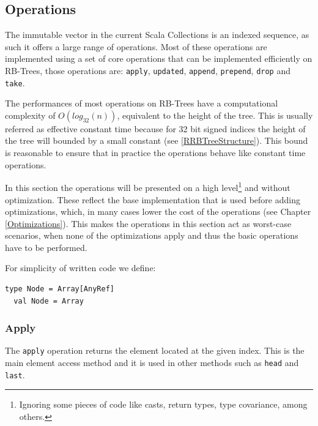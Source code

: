 \subsection{Operations}
\label{Operations}
The immutable vector in the current Scala Collections is an indexed sequence, as such it offers a large range of operations. Most of these operations are implemented using a set of core operations that can be implemented efficiently on RB-Trees, those operations are: \texttt{apply}, \texttt{updated}, \texttt{append}, \texttt{prepend}, \texttt{drop} and \texttt{take}. 

The performances of most operations on RB-Trees have a computational complexity of $O(log_{32}(n))$, equivalent to the height of the tree. This is usually referred as effective constant time because for 32 bit signed indices the height of the tree will bounded by a small constant (see \ref{RRBTreeStructure}). This bound is reasonable to ensure that in practice the operations behave like constant time operations.  
 
In this section the operations will be presented on a high level\footnote{Ignoring some pieces of code like casts, return types, type covariance, among others.} and without optimization. These reflect the base implementation that is used before adding optimizations, which, in many cases lower the cost of the operations (see Chapter \ref{Optimizations}). This makes the operations in this section act as worst-case scenarios, when none of the optimizations apply and thus the basic operations have to be performed.

For simplicity of written code we define:
\begin{lstlisting}[frame=single]
  type Node = Array[AnyRef]
  val Node = Array
\end{lstlisting}



\subsubsection{Apply}
\label{sec:apply}
The \texttt{apply} operation returns the element located at the given index. This is the main element access method and it is used in other methods such as \texttt{head} and \texttt{last}. 

